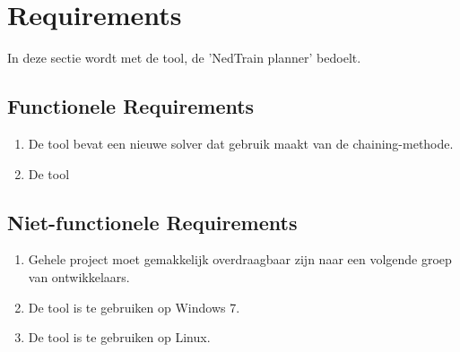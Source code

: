 \section{Requirements}
In deze sectie wordt met de tool, de 'NedTrain planner' bedoelt.

\subsection{Functionele Requirements}
\begin{enumerate}
    \item De tool bevat een nieuwe solver dat gebruik maakt van de chaining-methode. 
    \item De tool
\end{enumerate}

\subsection{Niet-functionele Requirements}
\begin{enumerate}
    \item Gehele project moet gemakkelijk overdraagbaar zijn naar een volgende groep van ontwikkelaars. 
    \item De tool is te gebruiken op Windows 7.
    \item De tool is te gebruiken op Linux.
\end{enumerate}
